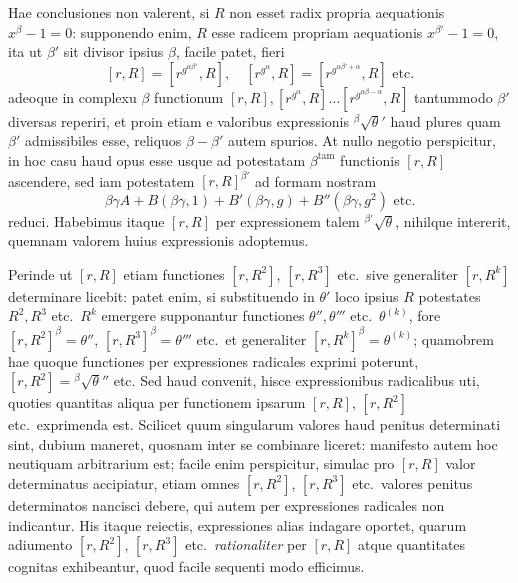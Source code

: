 Hae conclusiones non valerent, si $R$ non esset radix propria aequationis $x^\beta-1=0$: supponendo enim, $R$ esse radicem propriam aequationis $x^{\beta'}-1=0$, ita ut $\beta'$ sit divisor ipsius $\beta$, facile patet, fieri
\[
[r,R]=[r^{g^{\alpha\beta'}},R],\quad[r^{g^\alpha},R]=[r^{g^{\alpha\beta'+\alpha}},R]\text{ etc.}
\]
adeoque in complexu $\beta$ functionum $[r,R],[r^{g^\alpha},R]\ldots[r^{g^{\alpha\beta-\alpha}},R]$ tantummodo $\beta'$ diversas reperiri, et proin etiam e valoribus expressionis ${}^{\beta}\!\surd\theta'$ haud plures quam $\beta'$ admissibiles esse, reliquos $\beta-\beta'$ autem spurios. At nullo negotio perspicitur, in hoc casu haud opus esse usque ad potestatam $\beta^{\mathrm{tam}}$ functionis $[r,R]$ 
%
ascendere, sed iam potestatem $[r,R]^{\beta'}$ ad formam nostram
\[
\beta\gamma A+B(\beta\gamma,1)+B'(\beta\gamma,g)+B''(\beta\gamma,g^2)\text{ etc.}
\]
reduci. Habebimus itaque $[r,R]$ per expressionem talem ${}^{\beta'}\!\surd\theta$, nihilque intererit, quemnam valorem huius expressionis adoptemus.

Perinde ut $[r,R]$ etiam functiones $[r,R^2]$, $[r,R^3]$ etc.\ sive generaliter $[r,R^k]$ determinare licebit: patet enim, si substituendo in $\theta'$ loco ipsius $R$ potestates $R^2,R^3$ etc.\ $R^k$ emergere supponantur functiones $\theta'',\theta'''$ etc.\ $\theta^{(k)}$, fore $[r,R^2]^\beta=\theta''$, $[r,R^3]^\beta=\theta'''$ etc.\ et generaliter $[r,R^k]^\beta=\theta^{(k)}$; quamobrem hae quoque functiones per expressiones radicales exprimi poterunt, $[r,R^2]={}^{\beta}\!\surd\theta''$ etc. Sed haud convenit, hisce expressionibus radicalibus uti, quoties quantitas aliqua per functionem ipsarum $[r,R]$, $[r,R^2]$ etc.\ exprimenda est. Scilicet quum singularum valores haud penitus determinati sint, dubium maneret, quosnam inter se combinare liceret: manifesto autem hoc neutiquam arbitrarium est; facile enim perspicitur, simulac pro $[r,R]$ valor determinatus accipiatur, etiam omnes $[r,R^2]$, $[r,R^3]$ etc.\ valores penitus determinatos nancisci debere, qui autem per expressiones radicales non indicantur. His itaque reiectis, expressiones alias indagare oportet, quarum adiumento $[r,R^2]$, $[r,R^3]$ etc.\ \emph{rationaliter} per $[r,R]$ atque quantitates cognitas exhibeantur, quod facile sequenti modo efficimus.

